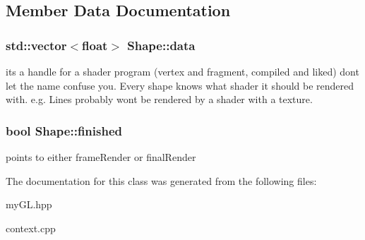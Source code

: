 \subsection{Member Data Documentation}
\hypertarget{classShape_a540c062d8d9719147efb7723ce0ceeea}{}
\subsubsection[{data}]{\setlength{\rightskip}{0pt plus 5cm}std\+::vector$<$float$>$ Shape\+::data}\label{classShape_a540c062d8d9719147efb7723ce0ceeea}
it\textquotesingle{}s a handle for a shader program (vertex and fragment, compiled and liked) don\textquotesingle{}t let the name confuse you. Every shape knows what shader it should be rendered with. e.\+g. Lines probably won\textquotesingle{}t be rendered by a shader with a texture. \hypertarget{classShape_ad766ebc1fafeb7f6c76d37ccfed88be4}{}
\subsubsection[{finished}]{\setlength{\rightskip}{0pt plus 5cm}bool Shape\+::finished}\label{classShape_ad766ebc1fafeb7f6c76d37ccfed88be4}
points to either frame\+Render or final\+Render 

The documentation for this class was generated from the following files\+:\begin{DoxyCompactItemize}
\item 
my\+G\+L.\+hpp\item 
context.\+cpp\end{DoxyCompactItemize}
